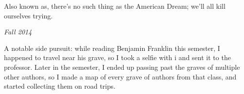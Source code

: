 Also known as, there's no such thing as the American Dream; we'll all kill
ourselves trying.

\begin{flushright}
\textit{Fall 2014}
\end{flushright}

A notable side pursuit: while reading Benjamin Franklin this semester, I
happened to travel near his grave, so I took a selfie with i and sent it to the
professor.  Later in the semester, I ended up passing past the graves of
multiple other authors, so I made a map of every grave of authors from that
class, and started collecting them on road trips.





\groupendnotes

